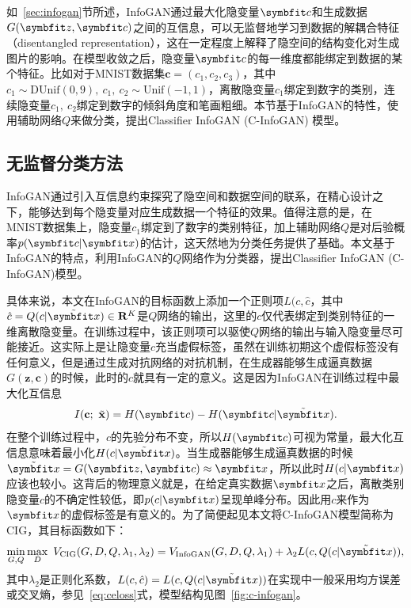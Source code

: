 如~\ref{sec:infogan}节所述，InfoGAN通过最大化隐变量$\bd{c}$和生成数据$G(\bd{z}, \bd{c})$之间的互信息，可以无监督地学习到数据的解耦合特征（disentangled representation），这在一定程度上解释了隐空间的结构变化对生成图片的影响。在模型收敛之后，隐变量$\bd{c}$的每一维度都能绑定到数据的某个特征。比如对于MNIST数据集$\mathbf{c} = (c_1, c_2, c_3)$，其中$c_1 \sim \text{DUnif}(0,9), ~c_1,~c_2 \sim \text{Unif}(-1,1)$，离散隐变量$c_1$绑定到数字的类别，连续隐变量$c_1, ~c_2$绑定到数字的倾斜角度和笔画粗细。本节基于InfoGAN的特性，使用辅助网络$Q$来做分类，提出Classifier InfoGAN (C-InfoGAN) 模型。

\subsection{无监督分类方法}
InfoGAN通过引入互信息约束探究了隐空间和数据空间的联系，在精心设计之下，能够达到每个隐变量对应生成数据一个特征的效果。值得注意的是，在MNIST数据集上，隐变量$c_1$绑定到了数字的类别特征，加上辅助网络$Q$是对后验概率$p(\bd{c}|\bd{x})$的估计，这天然地为分类任务提供了基础。本文基于InfoGAN的特点，利用InfoGAN的$Q$网络作为分类器，提出Classifier InfoGAN (C-InfoGAN)模型。

具体来说，本文在InfoGAN的目标函数上添加一个正则项$L(c,\hat{c}$，其中$\hat{c} = Q(c|\tilde{\bd{x}}) \in \reals^K$是$Q$网络的输出，这里的$c$仅代表绑定到类别特征的一维离散隐变量。在训练过程中，该正则项可以驱使$Q$网络的输出与输入隐变量尽可能接近。这实际上是让隐变量$c$充当虚假标签，虽然在训练初期这个虚假标签没有任何意义，但是通过生成对抗网络的对抗机制，在生成器能够生成逼真数据$G(\mathbf{z}, \mathbf{c})$的时候，此时的$c$就具有一定的意义。这是因为InfoGAN在训练过程中最大化互信息
\[
  I(\mathbf{c};~\tilde{\mathbf{x}}) = 
    H(\bd{c}) - H(\bd{c}|\tilde{\bd{x}}).
\]
在整个训练过程中，$c$的先验分布不变，所以$H(\bd{c})$可视为常量，最大化互信息意味着最小化$H(c|\tilde{\bd{x}})$。当生成器能够生成逼真数据的时候$\tilde{\bd{x}} = G(\bd{z},\bd{c}) \approx \bd{x}$，所以此时$H(c|\bd{x})$应该也较小。这背后的物理意义就是，在给定真实数据$\bd{x}$之后，离散类别隐变量$c$的不确定性较低，即$p(c|\bd{x})$呈现单峰分布。因此用$c$来作为$\bd{x}$的虚假标签是有意义的。为了简便起见本文将C-InfoGAN模型简称为CIG，其目标函数如下：
\begin{equation}
    \min_{G,Q}\max_D~ V_{\text{CIG}}(G,D,Q,\lambda_1,\lambda_2) = 
    V_{\text{InfoGAN}}(G,D,Q,\lambda_1) + \lambda_2 L(c, Q(c|\tilde{\bd{x}})),
\end{equation}
其中$\lambda_2$是正则化系数，$L(c,\hat{c}) = L(c, Q(c|\tilde{\bd{x}}))$在实现中一般采用均方误差或交叉熵，参见~\eqref{eq:celoss}式，模型结构见图~\ref{fig:c-infogan}。

